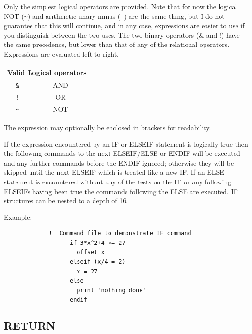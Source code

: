 \documentclass[11pt,twoside]{report}
\begin{document}
Only the simplest logical operators are provided. Note that for now the
logical NOT (\verb+~+) and arithmetic unary
minus (\verb+-+) are the same thing, but I do not guarantee
that this will continue, and in any case, expressions are easier to use if you
distinguish between the two uses. The two binary operators (\& and !) have the same precedence, but
lower than that of any of the relational operators. Expressions are evaluated
left to right.

\begin{center}
\begin{tabular}{|cc|} \hline
               \multicolumn{2}{|c|}{Valid Logical operators} \\ \hline
               \verb$&$          & AND \\
               \verb$!$          & OR \\
               \verb$~$          & NOT \\ \hline
\end{tabular}
\end{center}

The expression may optionally be enclosed in brackets for readability.

If the expression encountered by an IF or ELSEIF statement is logically true
then the following commands to the next ELSEIF/ELSE or ENDIF will be executed
and any further commands before the ENDIF ignored; otherwise they will be
skipped until the next ELSEIF which is treated like a new IF. If an ELSE
statement is encountered without any of the tests on the IF or any following
ELSEIFs having been true the commands following the ELSE are executed. IF
structures can be nested to a depth of 16.

Example:
\begin{verbatim}
             !  Command file to demonstrate IF command
                   if 3*x^2+4 <= 27
                     offset x
                   elseif (x/4 = 2)
                     x = 27
                   else
                     print 'nothing done'
                   endif
\end{verbatim}

\subsection{RETURN}
\end{document}
